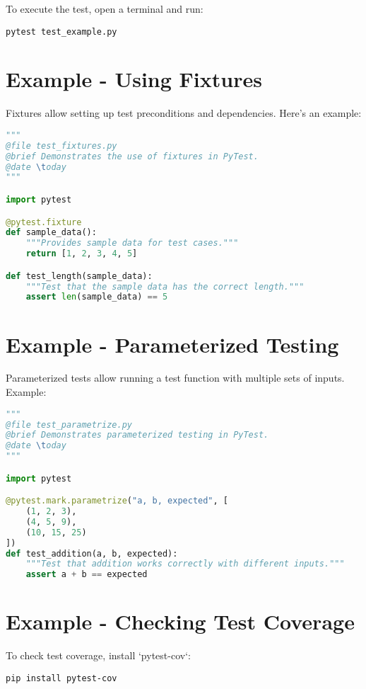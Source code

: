 To execute the test, open a terminal and run:

\begin{verbatim}
pytest test_example.py
\end{verbatim}

\section{Example - Using Fixtures}
Fixtures allow setting up test preconditions and dependencies. Here's an example:

\begin{lstlisting}[language=Python, caption=Using Fixtures in PyTest]
"""
@file test_fixtures.py
@brief Demonstrates the use of fixtures in PyTest.
@date \today
"""

import pytest

@pytest.fixture
def sample_data():
    """Provides sample data for test cases."""
    return [1, 2, 3, 4, 5]

def test_length(sample_data):
    """Test that the sample data has the correct length."""
    assert len(sample_data) == 5
\end{lstlisting}

\section{Example - Parameterized Testing}
Parameterized tests allow running a test function with multiple sets of inputs. Example:

\begin{lstlisting}[language=Python, caption=Parameterized Test in PyTest]
"""
@file test_parametrize.py
@brief Demonstrates parameterized testing in PyTest.
@date \today
"""

import pytest

@pytest.mark.parametrize("a, b, expected", [
    (1, 2, 3),
    (4, 5, 9),
    (10, 15, 25)
])
def test_addition(a, b, expected):
    """Test that addition works correctly with different inputs."""
    assert a + b == expected
\end{lstlisting}

\section{Example - Checking Test Coverage}
To check test coverage, install `pytest-cov`:

\begin{verbatim}
pip install pytest-cov
\end{verbatim}


